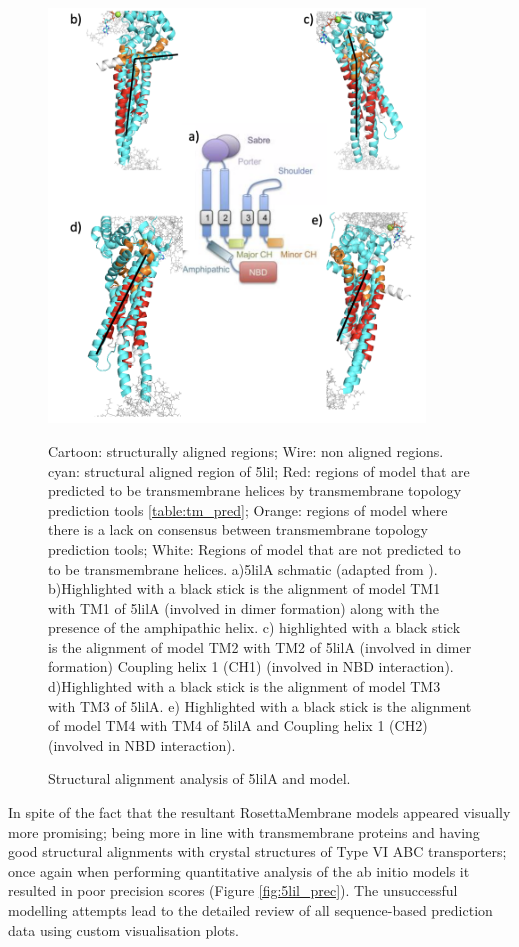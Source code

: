 \begin{figure}[th!]
    \centering
    \includegraphics [width=100mm, scale =0.5]{Results/macb_fig.png}
    \caption{Structural alignment analysis of 5lilA and model.}
    \label{fig:5lil_schem}
    \small
    Cartoon: structurally aligned regions; Wire: non aligned regions. cyan: structural aligned region of 5lil; Red: regions of model that are predicted to be transmembrane helices by transmembrane topology prediction tools \ref{table:tm_pred}; Orange: regions of model where there is a lack on consensus between transmembrane topology prediction tools; White: Regions of model that are not predicted to to be transmembrane helices. 
    a)5lilA schmatic (adapted from \cite{pichoff2019roles}). b)Highlighted with a black stick is the alignment of model TM1 with TM1 of 5lilA (involved in dimer formation) along with the presence of the amphipathic helix. c) highlighted with a black stick is the alignment of model TM2 with TM2 of 5lilA (involved in dimer formation) Coupling helix 1 (CH1) (involved in NBD interaction). d)Highlighted with a black stick is the alignment of model TM3 with TM3 of 5lilA. e) Highlighted with a black stick is the alignment of model TM4 with TM4 of 5lilA and Coupling helix 1 (CH2) (involved in NBD interaction). 
\end{figure}

In spite of the fact that the resultant RosettaMembrane models appeared visually more promising; being more in line with transmembrane proteins and having good structural alignments with crystal structures of Type VI ABC transporters; once again when performing quantitative analysis of the ab initio models it resulted in poor precision scores (Figure \ref{fig:5lil_prec}). The unsuccessful modelling attempts lead to the detailed review of all sequence-based prediction data using custom visualisation plots.

